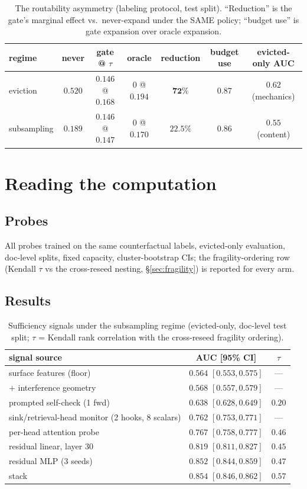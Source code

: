 \documentclass[11pt]{article}
\begin{document}
\begin{table}[t]
\centering
\small
\caption{The routability asymmetry (labeling protocol, test split).
``Reduction'' is the gate's marginal effect vs.\ never-expand under the SAME
policy; ``budget use'' is gate expansion over oracle expansion.}
\label{tab:routability}
\begin{tabular}{lcccccc}
\toprule
regime & never & gate @ $\tau$ & oracle & reduction & budget use &
evicted-only AUC \\
\midrule
eviction & $0.520$ & $0.146$ @ $0.168$ & $0$ @ $0.194$ & $\mathbf{72\%}$
& $0.87$ & $0.62$ (mechanics) \\
subsampling & $0.189$ & $0.146$ @ $0.147$ & $0$ @ $0.170$ & $\mathbf{22.5\%}$
& $0.86$ & $0.55$ (content) \\
\bottomrule
\end{tabular}
\end{table}

\section{Reading the computation}
\label{sec:reading}

\subsection{Probes}
All probes trained on the same counterfactual labels, evicted-only
evaluation, doc-level splits, fixed capacity, cluster-bootstrap CIs; the
fragility-ordering row (Kendall $\tau$ vs the cross-reseed nesting,
\S\ref{sec:fragility}) is reported for every arm.

\subsection{Results}
\label{sec:proberesults}

\begin{table}[t]
\centering
\caption{Sufficiency signals under the subsampling regime (evicted-only,
doc-level test split; $\tau$ = Kendall rank correlation with the cross-reseed
fragility ordering).}
\label{tab:probes}
\begin{tabular}{lcc}
\toprule
signal source & AUC [95\% CI] & $\tau$ \\
\midrule
surface features (floor) & $0.564$ $[0.553, 0.575]$ & --- \\
$+$ interference geometry & $0.568$ $[0.557, 0.579]$ & --- \\
prompted self-check (1 fwd) & $0.638$ $[0.628, 0.649]$ & $0.20$ \\
sink/retrieval-head monitor (2 hooks, 8 scalars) & $0.762$ $[0.753, 0.771]$ & --- \\
per-head attention probe & $0.767$ $[0.758, 0.777]$ & $0.46$ \\
residual linear, layer 30 & $0.819$ $[0.811, 0.827]$ & $0.45$ \\
residual MLP (3 seeds) & $0.852$ $[0.844, 0.859]$ & $0.47$ \\
stack & $\mathbf{0.854}$ $[0.846, 0.862]$ & $\mathbf{0.57}$ \\
\bottomrule
\end{tabular}
\end{table}
\end{document}
